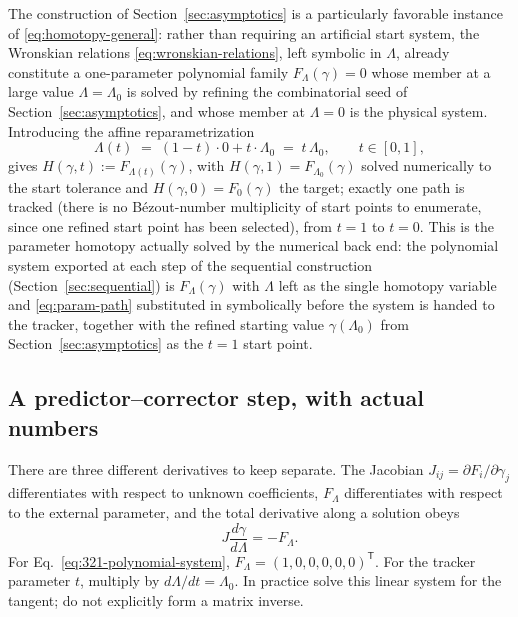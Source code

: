 \documentclass[11pt]{article}
\begin{document}
The construction of Section~\ref{sec:asymptotics} is a particularly
favorable instance of \eqref{eq:homotopy-general}: rather than requiring
an artificial start system, the Wronskian relations
\eqref{eq:wronskian-relations}, left symbolic in $\Lambda$, already
constitute a one-parameter polynomial family $F_\Lambda(\gamma)=0$ whose
member at a large value $\Lambda=\Lambda_0$ is solved by refining the
combinatorial seed of Section~\ref{sec:asymptotics}, and whose member at $\Lambda=0$
is the physical system. Introducing the affine reparametrization
\begin{equation}
  \label{eq:param-path}
  \Lambda(t) \;=\; (1-t)\cdot 0 + t\cdot\Lambda_0 \;=\; t\,\Lambda_0, \qquad t\in[0,1],
\end{equation}
gives $H(\gamma,t):=F_{\Lambda(t)}(\gamma)$, with $H(\gamma,1)=F_{\Lambda_0}(\gamma)$
solved numerically to the start tolerance and $H(\gamma,0)=F_0(\gamma)$ the target; exactly one path
is tracked (there is no Bézout-number multiplicity of start points to
enumerate, since one refined start point has been selected), from $t=1$ to
$t=0$. This is the parameter homotopy actually solved by the numerical
back end: the polynomial system exported at each step of the sequential
construction (Section~\ref{sec:sequential}) is $F_\Lambda(\gamma)$ with
$\Lambda$ left as the single homotopy variable and \eqref{eq:param-path}
substituted in symbolically before the system is handed to the tracker,
together with the refined starting value $\gamma(\Lambda_0)$ from
Section~\ref{sec:asymptotics} as the $t=1$ start point.

\subsection{A predictor--corrector step, with actual numbers}
\label{sec:predictor-detail}

There are three different derivatives to keep separate. The Jacobian
$J_{ij}=\partial F_i/\partial\gamma_j$ differentiates with respect to
unknown coefficients, $F_\Lambda$ differentiates with respect to the
external parameter, and the total derivative along a solution obeys
\begin{equation}
 \label{eq:param-davidenko}
 J\frac{d\gamma}{d\Lambda}=-F_\Lambda.
\end{equation}
For Eq.~\eqref{eq:321-polynomial-system},
$F_\Lambda=(1,0,0,0,0,0)^\mathsf T$.
For the tracker parameter $t$, multiply by $d\Lambda/dt=\Lambda_0$.
In practice solve this linear system for the tangent; do not explicitly
form a matrix inverse.
\end{document}
